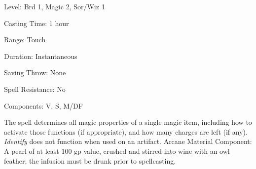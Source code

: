 
\begin{description*}
\item[Level:] Brd 1, Magic 2, Sor/Wiz 1
\item[Casting Time:] 1 hour
\item[Range:] Touch
\item[Duration:] Instantaneous
\item[Saving Throw:] None
\item[Spell Resistance:] No
\item[Components:] V, S, M/DF
\end{description*}

The spell determines all magic properties of a single magic item, including how
to activate those functions (if appropriate), and how many charges are left (if
any).
\textit{Identify} does not function when used on an artifact.
Arcane Material Component: A pearl of at least 100 gp value, crushed and
stirred into wine with an owl feather; the infusion must be drunk prior to spellcasting.